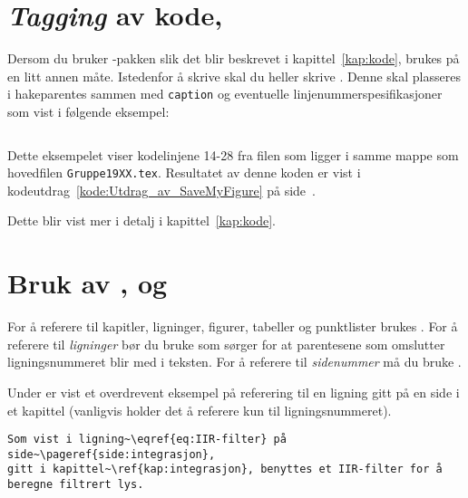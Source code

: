 \section{{\em Tagging} av kode, }
Dersom du bruker  -pakken slik
det blir beskrevet i
kapittel~\ref{kap:kode}, brukes  på en litt annen måte. 
Istedenfor å skrive  skal du heller skrive
. Denne skal plasseres i hakeparentes
sammen med {\tt caption} og eventuelle linjenummerspesifikasjoner som vist i
følgende eksempel:

\begin{boxedminipage}{\textwidth}
\begin{verbatim}

\end{verbatim}
\end{boxedminipage}

Dette eksempelet viser kodelinjene 14-28 fra filen 
 som ligger i samme mappe som hovedfilen 
{\tt  Gruppe19XX.tex}.
Resultatet av denne koden er vist i kodeutdrag~\ref{kode:Utdrag_av_SaveMyFigure} 
    på side~\pageref{kode:Utdrag_av_SaveMyFigure}.

Dette blir vist mer i detalj i kapittel~\ref{kap:kode}.

\section{Bruk av ,  og }\label{delkap:ref}
For å referere til  kapitler, ligninger, figurer, tabeller og punktlister 
brukes . 
For å referere til {\em ligninger} bør du bruke
 som sørger for at parentesene som
omslutter ligningsnummeret blir med i teksten.
For å referere til {\em sidenummer} 
må du bruke  .

Under er vist et overdrevent eksempel på referering til en ligning gitt på en side
i et kapittel (vanligvis holder det å referere kun til
ligningsnummeret).

\begin{boxedminipage}{\textwidth}
\begin{verbatim}
Som vist i ligning~\eqref{eq:IIR-filter} på side~\pageref{side:integrasjon},  
gitt i kapittel~\ref{kap:integrasjon}, benyttes et IIR-filter for å
beregne filtrert lys. 
\end{verbatim}
\end{boxedminipage}

